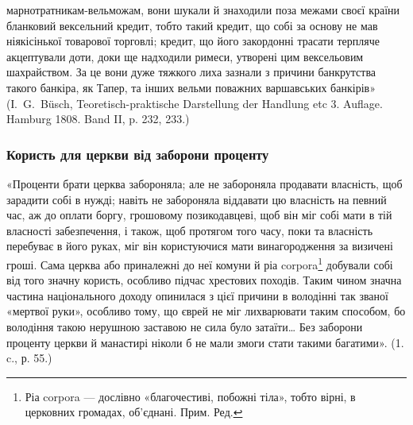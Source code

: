 \parcont{}  %
марнотратникам-вельможам, вони шукали й знаходили поза межами своєї країни
бланковий вексельний кредит, тобто такий кредит, що собі за основу не мав
ніякісінької товарової торговлі; кредит, що його закордонні трасати терпляче
акцептували доти, доки ще надходили римеси, утворені цим вексельовим шахрайством.
За це вони дуже тяжкого лиха зазнали з причини банкрутства такого
банкіра, як Тапер, та інших вельми поважних варшавських банкірів» (І.~G.~Büsch,
Teoretisch-praktische Darstellung der Handlung etc 3. Auflage. Hamburg 1808. Band
II, p. 232, 233.)

\subsubsection{Користь для церкви від заборони проценту}

«Проценти брати церква забороняла; але не забороняла продавати власність,
щоб зарадити собі в нужді; навіть не забороняла віддавати цю власність
на певний час, аж до оплати боргу, грошовому позикодавцеві, щоб він міг собі
мати в тій власності забезпечення, і також, щоб протягом того часу, поки та
власність перебуває в його руках, міг він користуючися мати винагородження
за визичені гроші. Сама церква або приналежні до неї комуни й ріа corpora\footnote*{
Ріа corpora — дослівно «благочестиві, побожні тіла», тобто вірні, в церковних громадах,
об’єднані. Прим. Ред.
} добували
собі від того значну користь, особливо підчас хрестових походів. Таким
чином значна частина національного доходу опинилася з цієї причини в володінні
так званої «мертвої руки», особливо тому, що єврей не міг лихварювати таким
способом, бо володіння такою нерушною заставою не сила було затаїти\dots{} Без
заборони проценту церкви й манастирі ніколи б не мали змоги стати такими
багатими». (1. c., р. 55.)

